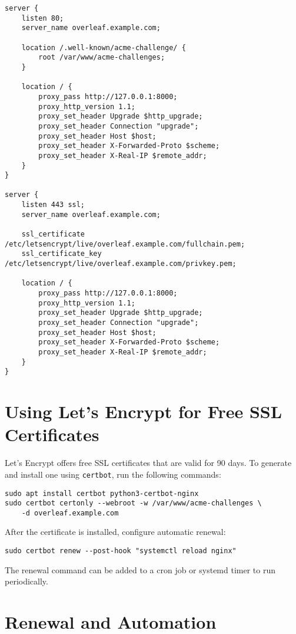 \begin{verbatim}
server {
    listen 80;
    server_name overleaf.example.com;

    location /.well-known/acme-challenge/ {
        root /var/www/acme-challenges;
    }

    location / {
        proxy_pass http://127.0.0.1:8000;
        proxy_http_version 1.1;
        proxy_set_header Upgrade $http_upgrade;
        proxy_set_header Connection "upgrade";
        proxy_set_header Host $host;
        proxy_set_header X-Forwarded-Proto $scheme;
        proxy_set_header X-Real-IP $remote_addr;
    }
}

server {
    listen 443 ssl;
    server_name overleaf.example.com;

    ssl_certificate /etc/letsencrypt/live/overleaf.example.com/fullchain.pem;
    ssl_certificate_key /etc/letsencrypt/live/overleaf.example.com/privkey.pem;

    location / {
        proxy_pass http://127.0.0.1:8000;
        proxy_http_version 1.1;
        proxy_set_header Upgrade $http_upgrade;
        proxy_set_header Connection "upgrade";
        proxy_set_header Host $host;
        proxy_set_header X-Forwarded-Proto $scheme;
        proxy_set_header X-Real-IP $remote_addr;
    }
}
\end{verbatim}

\section{Using Let’s Encrypt for Free SSL Certificates}

Let’s Encrypt offers free SSL certificates that are valid for 90 days. To generate and install one using \texttt{certbot}, run the following commands:

\begin{verbatim}
sudo apt install certbot python3-certbot-nginx
sudo certbot certonly --webroot -w /var/www/acme-challenges \
    -d overleaf.example.com
\end{verbatim}

After the certificate is installed, configure automatic renewal:

\begin{verbatim}
sudo certbot renew --post-hook "systemctl reload nginx"
\end{verbatim}

The renewal command can be added to a cron job or systemd timer to run periodically.

\section{Renewal and Automation}

